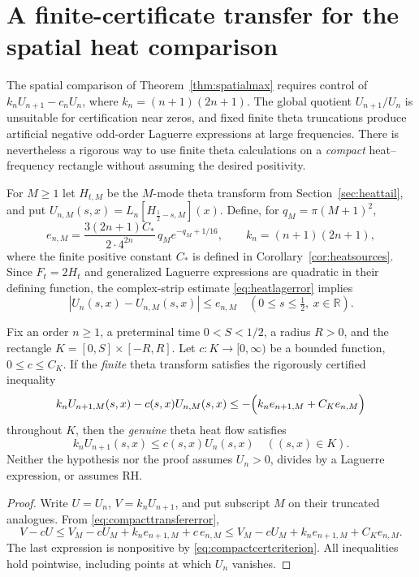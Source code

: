 \section{A finite-certificate transfer for the spatial heat comparison}
\label{sec:compacttransfer}
The spatial comparison of
Theorem~\ref{thm:spatialmax} requires control of
$k_nU_{n+1}-c_nU_n$, where
$k_n=(n+1)(2n+1)$.
The global quotient $U_{n+1}/U_n$ is unsuitable for
certification near zeros, and fixed finite theta
truncations produce artificial negative odd-order
Laguerre expressions at large frequencies.
There is nevertheless a rigorous way to use
finite theta calculations on a \emph{compact}
heat--frequency rectangle without assuming
the desired positivity.

For $M\ge1$ let $H_{t,M}$ be the $M$-mode
theta transform from
Section~\ref{sec:heattail}, and put
$U_{n,M}(s,x)=L_n[H_{\frac12-s,M}](x)$.
Define, for $q_M=\pi(M+1)^2$,
\[
e_{n,M}=
\frac{3(2n+1)C_*}{2\cdot4^{2n}}\,
q_Me^{-q_M+1/16},
\qquad k_n=(n+1)(2n+1),
\]
where the finite positive constant $C_*$ is
defined in Corollary~\ref{cor:heatsources}.
Since $F_t=2H_t$ and generalized Laguerre
expressions are quadratic in their defining
function, the complex-strip estimate
\eqref{eq:heatlagerror} implies
\begin{equation}
|U_n(s,x)-U_{n,M}(s,x)|\le e_{n,M}
\quad(0\le s\le\tfrac12,\ x\in\mathbb R).
\label{eq:compacttransfererror}
\end{equation}

\begin{theorem}
\label{thm:compacttransfer}
Fix an order $n\ge1$, a preterminal time
$0<S<1/2$, a radius $R>0$, and the rectangle
$K=[0,S]\times[-R,R]$.
Let $c:K\to[0,\infty)$ be a bounded function,
$0\le c\le C_K$. If the \emph{finite} theta
transform satisfies the rigorously certified
inequality
\begin{equation}
\begin{aligned}
k_nU_{n+1,M}(s,x)-c(s,x)U_{n,M}(s,x)
\le -\Bigl(k_ne_{n+1,M}+C_Ke_{n,M}\Bigr)
\end{aligned}
\label{eq:compactcertcriterion}
\end{equation}
throughout $K$, then the \emph{genuine}
theta heat flow satisfies
\[
k_nU_{n+1}(s,x)\le c(s,x)U_n(s,x)
\quad((s,x)\in K).
\]
Neither the hypothesis nor the proof assumes
$U_n>0$, divides by a Laguerre expression, or
assumes RH.
\end{theorem}
\begin{proof}
Write $U=U_n$, $V=k_nU_{n+1}$, and put
subscript $M$ on their truncated analogues.
From \eqref{eq:compacttransfererror},
\[
V-cU
\le V_M-cU_M+
k_ne_{n+1,M}+c\,e_{n,M}
\le V_M-cU_M+
k_ne_{n+1,M}+C_Ke_{n,M}.
\]
The last expression is nonpositive
by \eqref{eq:compactcertcriterion}.
All inequalities hold pointwise, including
points at which $U_n$ vanishes.
\end{proof}

